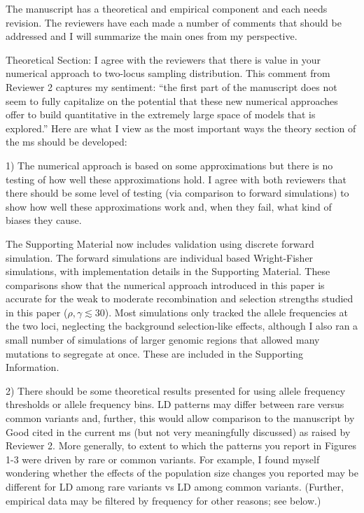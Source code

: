 \documentclass{article}
\newenvironment{response}%
  {\list{}{\leftmargin=0.5in\rightmargin=0.5in\color{blue}}\item[]}%
  {\endlist}
\begin{document}
The manuscript has a theoretical and empirical component and each needs
revision.  The reviewers have each made a number of comments that should be
addressed and I will summarize the main ones from my perspective.

Theoretical Section: I agree with the reviewers that there is value in your
numerical approach to two-locus sampling distribution. This comment from
Reviewer 2 captures my sentiment: ``the first part of the manuscript does not
seem to fully capitalize on the potential that these new numerical approaches
offer to build quantitative in the extremely large space of models that is
explored.'' Here are what I view as the most important ways the theory section
of the ms should be developed:

1) The numerical approach is based on some approximations but there is no
testing of how well these approximations hold. I agree with both reviewers that
there should be some level of testing (via comparison to forward simulations)
to show how well these approximations work and, when they fail, what kind of
biases they cause.

\begin{response}
    The Supporting Material now includes validation using discrete
    forward simulation. The forward simulations are individual based
    Wright-Fisher simulations, with implementation details in the Supporting
    Material. These comparisons show that the numerical approach introduced in
    this paper is accurate for the weak to moderate recombination and selection
    strengths studied in this paper ($\rho, \gamma \lesssim 30$).
    Most simulations only tracked the allele frequencies at the two loci,
    neglecting the background selection-like effects,
    although I also ran a small number of simulations of larger genomic
    regions that allowed many mutations to segregate at once. These are included
    in the Supporting Information.
\end{response}

2) There should be some theoretical results presented for using allele
frequency thresholds or allele frequency bins. LD patterns may differ between
rare versus common variants and, further, this would allow comparison to the
manuscript by Good cited in the current ms (but not very meaningfully
discussed) as raised by Reviewer 2. More generally, to extent to which the
patterns you report in Figures 1-3 were driven by rare or common variants. For
example, I found myself wondering whether the effects of the population size
changes you reported may be different for LD among rare variants vs LD among
common variants. (Further, empirical data may be filtered by frequency for
other reasons; see below.)
\end{document}
